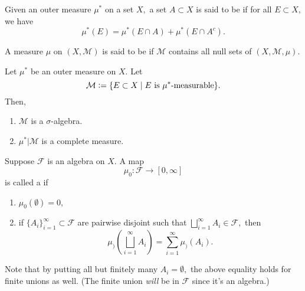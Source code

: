 \documentclass[12pt]{article}	%
\begin{document}
\begin{defn}[$\mu^*$-measurable]
	Given an outer measure $\mu^*$ on a set $X,$ a set $A \subset X$ is said to be  if for all $E \subset X,$ we have
	\begin{equation*} 
		\mu^*(E) = \mu^*(E \cap A) + \mu^*(E \cap A^c).
	\end{equation*}
\end{defn}

\begin{defn}
	A measure $\mu$ on $(X, \mathcal{M})$ is said to be  if $\mathcal{M}$ contains all null sets of $(X, \mathcal{M}, \mu).$
\end{defn}

\begin{thm}[Carathéodory]
	Let $\mu^*$ be an outer measure on $X.$ Let
	\begin{equation*} 
		\mathcal{M} \vcentcolon= \{E \subset X \mid E \text{ is } \mu^*\text{-measurable}\}.
	\end{equation*}
	Then,
	\begin{enumerate}
		\item $\mathcal{M}$ is a $\sigma$-algebra.
		\item $\mu^*|\mathcal{M}$ is a complete measure.
	\end{enumerate} 
\end{thm}

\begin{defn}
	Suppose $\mathcal{F}$ is an algebra on $X.$ A map
	\begin{equation*} 
		\mu_0 : \mathcal{F} \to [0, \infty]
	\end{equation*}
	is called a  if
	\begin{enumerate}
		\item $\mu_0(\emptyset) = 0,$
		\item if $\{A_i\}_{i = 1}^\infty \subset \mathcal{F}$ are pairwise disjoint such that $\bigsqcup_{i = 1}^\infty A_i \in \mathcal{F},$ then
		\begin{equation*} 
			\mu_)\left(\bigsqcup_{i = 1}^\infty A_i\right) = \sum_{i = 1}^{\infty} \mu_)(A_i).
		\end{equation*}
	\end{enumerate}
\end{defn}
Note that by putting all but finitely many $A_i = \emptyset,$ the above equality holds for finite unions as well. (The finite union \emph{will} be in $\mathcal{F}$ since it's an algebra.)
\end{document}
